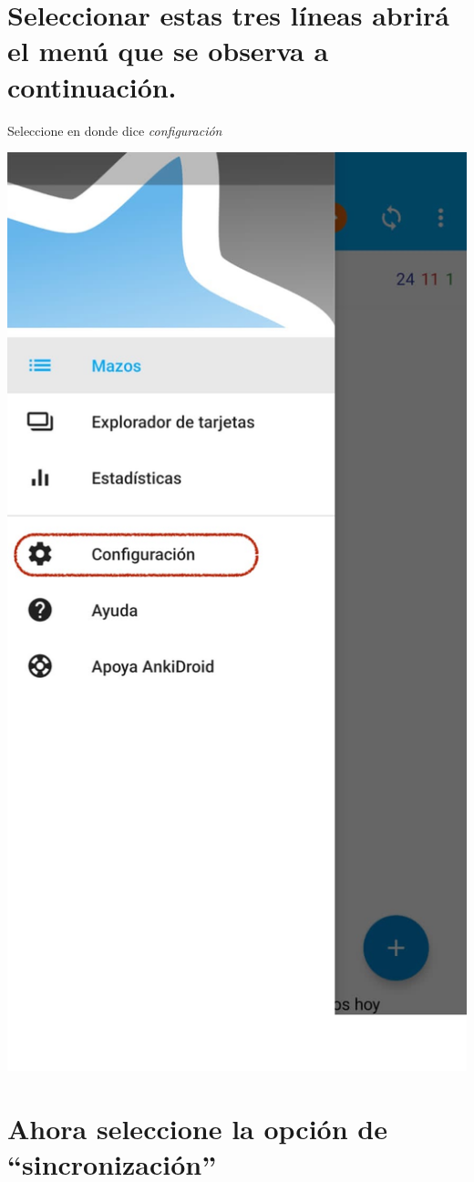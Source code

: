\documentclass[
]{book}
\begin{document}
\hypertarget{seleccionar-estas-tres-luxedneas-abriruxe1-el-menuxfa-que-se-observa-a-continuaciuxf3n.}{%
\section{Seleccionar estas tres líneas abrirá el menú que se observa a continuación.}\label{seleccionar-estas-tres-luxedneas-abriruxe1-el-menuxfa-que-se-observa-a-continuaciuxf3n.}}

Seleccione en donde dice \emph{configuración}

\includegraphics[width=0.5\linewidth]{images/reposit_sp/menu_config}

\hypertarget{ahora-seleccione-la-opciuxf3n-de-sincronizaciuxf3n}{%
\section{Ahora seleccione la opción de ``sincronización''}\label{ahora-seleccione-la-opciuxf3n-de-sincronizaciuxf3n}}
\end{document}
